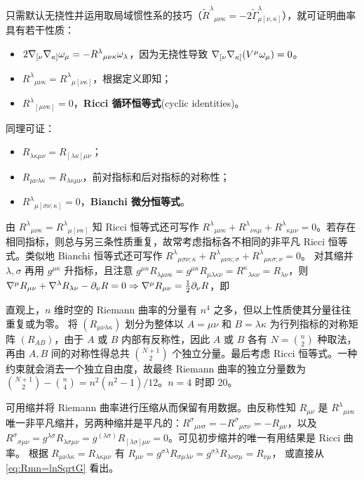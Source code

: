 只需默认无挠性并运用取局域惯性系的技巧（$\tilde R^\lambda{}_{\mu\nu\kappa}=-2\tilde \Gamma^\lambda_{\mu[\nu,\kappa]}$），就可证明曲率具有若干性质：
\begin{itemize}
    \item $2\nabla_{[\nu}\nabla_{\kappa]} \omega_\mu = - R^\lambda{}_{\mu\nu\kappa} \omega_\lambda$，因为无挠性导致 $\nabla_{[\nu}\nabla_{\kappa]}(V^\mu \omega_\mu)=0$。
    \item ${R^\lambda}_{\mu\nu\kappa}={R^\lambda}_{\mu[\nu\kappa]}$，根据定义即知；
    \item ${R^\lambda}_{[\mu\nu\kappa]}=0$，\textbf{Ricci 循环恒等式}(cyclic identities)。
\end{itemize}
同理可证：
\begin{itemize}
    \item $R_{\lambda\kappa\mu\nu}=R_{[\lambda\kappa]\mu\nu}$；
    \item $R_{\mu\nu\lambda\kappa}=R_{\lambda\kappa\mu\nu}$，前对指标和后对指标的对称性；
    \item $R^\lambda{}_{ \mu [\sigma\nu ; \kappa]}=0$，\textbf{Bianchi 微分恒等式}。
\end{itemize}
由 ${R^\lambda}_{\mu\nu\kappa}={R^\lambda}_{\mu[\nu\kappa]}$ 知 Ricci 恒等式还可写作 $R^\lambda{}_{\mu\nu\kappa}+R^\lambda{}_{\nu\kappa\mu}+R^\lambda{}_{\kappa\mu\nu}=0$。若存在相同指标，则总与另三条性质重复，故常考虑指标各不相同的非平凡 Ricci 恒等式。类似地 Bianchi 恒等式还可写作 $R^\lambda{}_{ \mu \sigma\nu ; \kappa}+R^\lambda{}_{ \mu \nu\kappa;\sigma}+R^\lambda{}_{ \mu \kappa\sigma;\nu}=0$。
对其缩并 $\lambda,\sigma$ 再用 $g^{\mu\kappa}$ 升指标，且注意 $g^{\mu\kappa} R_{\lambda \mu\nu\kappa}=g^{\mu\kappa} R_{\mu\lambda\kappa \nu}=R^{\kappa}{}_{\lambda\kappa \nu}=R_{\lambda\nu}$，则 $\nabla^{\mu} R_{\mu\nu}+ \nabla^\lambda R_{\lambda\nu}-\partial_\nu R=0\Rightarrow\nabla^{\mu} R_{\mu\nu}=\frac 12\partial_\nu R$，即

直观上，$n$ 维时空的 Riemann 曲率的分量有 $n^4$ 之多，但以上性质使其分量往往重复或为零。
将 $(R_{\mu\nu\lambda\kappa})$ 划分为整体以 $A=\mu\nu$ 和 $B=\lambda\kappa$ 为行列指标的对称矩阵 $(R_{AB})$，由于 $A$ 或 $B$ 内部有反称性，因此 $A$ 或 $B$ 各有 $N=\binom{n}{2}$ 种取法，再由 $A,B$ 间的对称性得总共 $\binom{N+1}{2}$ 个独立分量。最后考虑 Ricci 恒等式。一种约束就会消去一个独立自由度，故最终 Riemann 曲率的独立分量数为 $\binom{N+1}{2}-\binom{n}{4}={n^2(n^2-1)}/{12}$。$n=4$ 时即 20。

可用缩并将 Riemann 曲率进行压缩从而保留有用数据。由反称性知
$R_{\mu\nu}$ 是 ${R^\lambda}_{\mu\nu\kappa}$ 唯一非平凡缩并，另两种缩并是平凡的：$R^\sigma{}_{\mu\nu\sigma}=-R^\sigma{}_{\mu\sigma\nu}=-R_{\mu\nu}$，以及 $R^\sigma{}_{\sigma\mu\nu}=g^{\lambda\sigma}R_{\lambda\sigma\mu\nu}=g^{(\lambda\sigma)}R_{[\lambda\sigma]\mu\nu}=0$。可见初步缩并的唯一有用结果是 Ricci 曲率。
根据 $R_{\mu\nu\lambda\kappa}=R_{\lambda\kappa\mu\nu}$ 有 $R_{\mu\nu}=g^{\sigma\lambda}R_{\sigma\mu\lambda\nu}=g^{\sigma\lambda}R_{\lambda\nu\sigma\mu}=R_{\nu\mu}$，
或直接从 \eqref{eq:Rmn=lnSqrtG} 看出。

